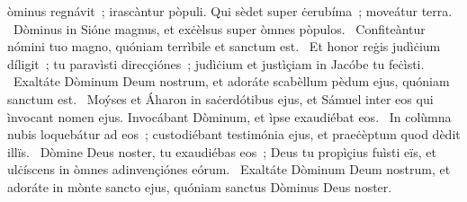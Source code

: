 \psalmChapterWithInscription{}
{ }
{%
òminus regnávit~; irascàntur pòpuli. Qui sèdet super ċerubíma~; moveátur terra. 
~Dòminus in Sióne magnus, et exċèlsus super òmnes pòpulos. 
~Confiteàntur nómini tuo magno, quóniam terrìbile et sanctum est. 
~Et honor reġis judìċium díligit~; tu paravìsti direcçiónes~; judìċium et justìçiam in Jacóbe tu feċìsti. 
~Exaltáte Dòminum Deum nostrum, et adoráte scabèllum pèdum ejus, quóniam sanctum est. 
~Moýses et Áharon in saċerdótibus ejus, et Sámuel inter eos qui ìnvocant nomen ejus. Invocábant Dòminum, et ìpse exaudiébat eos. 
~In colùmna nubis loquebátur ad eos~; custodiébant testimónia ejus, et praeċèptum quod dèdit illïs. 
~Dòmine Deus noster, tu exaudiébas eos~; Deus tu propìçius fuìsti eïs, et ulċíscens in òmnes adinvençiónes eórum. 
~Exaltáte Dòminum Deum nostrum, et adoráte in mònte sancto ejus, quóniam sanctus Dòminus Deus noster. 
}
